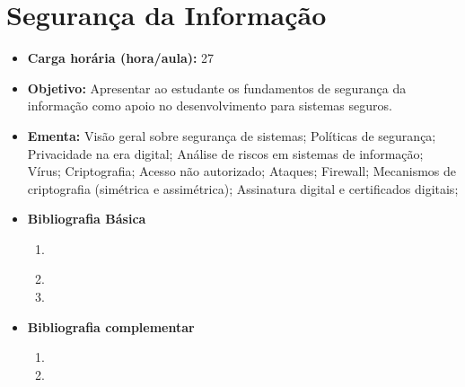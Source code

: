 \documentclass[11pt,fleqn]{book} %
\begin{document}
\section{Segurança da Informação}\label{6_seginfo}
\begin{itemize}
	\item \textbf{Carga horária (hora/aula):} 27
	\item \textbf{Objetivo:} Apresentar ao estudante os fundamentos de segurança da informação como apoio no desenvolvimento para sistemas seguros.
	\item \textbf{Ementa:} 
	Visão geral sobre segurança de sistemas;
	Políticas de segurança; 
	Privacidade na era digital;
	Análise de riscos em sistemas de informação;
	Vírus;
	Criptografia; 
	Acesso não autorizado; 
	Ataques;
	Firewall;
	Mecanismos de criptografia (simétrica e assimétrica);
	Assinatura digital e certificados digitais;
	\item \textbf{Bibliografia Básica}
	\begin{enumerate}
		\item \cite{cartilha2012}
		\item 
		\item 
	\end{enumerate}
	\item \textbf{Bibliografia complementar}
	\begin{enumerate}
		\item 
		\item
	\end{enumerate} 	
\end{itemize}


\newpage
\end{document}
